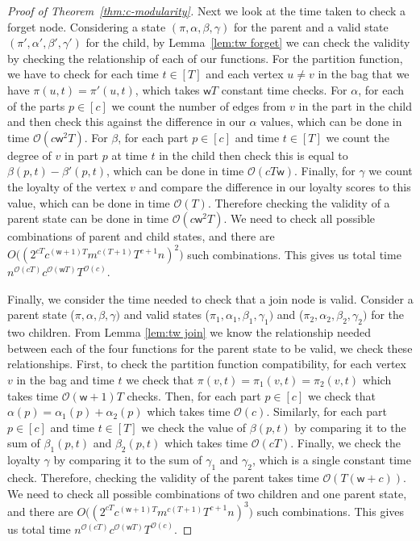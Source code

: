 \documentclass[runningheads]{llncs}
\newcommand{\w}{\mathsf{w}}
\begin{document}
\begin{proof}[Proof of Theorem~\ref{thm:c-modularity}]
    Next we look at the time taken to check a forget node. Considering a state $(\pi,\alpha,\beta,\gamma)$ for the parent and a valid state $(\pi',\alpha',\beta',\gamma')$ for the child, by  Lemma~\ref{lem:tw forget} we can check the validity by checking the relationship of each of our functions.
    For the partition function, we have to check for each time $t\in [T]$ and each vertex $u \neq v$ in the bag that we have $\pi(u,t)=\pi'(u,t)$, which takes $\w T$ constant time checks. 
    For $\alpha$, for each of the parts $p\in[c]$ we count the number of edges from $v$ in the part in the child and then check this against the difference in our $\alpha$ values, which can be done in time $\mathcal{O}(c\w ^2T)$.
    For $\beta$, for each part $p\in[c]$ and time $t\in[T]$ we count the degree of $v$ in part $p$ at time $t$ in the child then check this is equal to $\beta(p,t)-\beta'(p,t)$, which can be done in time $\mathcal{O}(cT\w )$.
    Finally, for $\gamma$ we count the loyalty of the vertex $v$ and compare the difference in our loyalty scores to this value, which can be done in time $\mathcal{O}(T)$.
    Therefore checking the validity of a parent state can be done in time $\mathcal{O}(c\w ^2T)$. 
    We need to check all possible combinations of parent and child states, and there are $O\big((2^{cT}c^{(\w +1)T}m^{c(T+1)}T^{c+1}n)^2\big)$
     such combinations. This gives us total time $n^{\mathcal{O}(cT)}c^{\mathcal{O}(\w T)}T^{\mathcal{O}(c)}$.

    Finally, we consider the time needed to check that a join node is valid. Consider a parent state ($\pi,\alpha,\beta,\gamma)$ and valid states ($\pi_1,\alpha_1,\beta_1,\gamma_1)$ and ($\pi_2,\alpha_2,\beta_2,\gamma_2)$ for the two children. From Lemma \ref{lem:tw join} we know the relationship needed between each of the four functions for the parent state to be valid, we check these relationships.
    First, to check the partition function compatibility, for each vertex $v$ in the bag and time $t$ we check that $\pi(v,t)=\pi_1(v,t)=\pi_2(v,t)$ which takes time $\mathcal{O}(\w+1)T$ checks.
    Then, for each part $p \in [c]$ we check that $\alpha(p)=\alpha_1(p)+\alpha_2(p)$ which takes time $\mathcal{O}(c)$.
    Similarly, for each part $p\in[c]$ and time $t\in[T]$ we check the value of $\beta(p,t)$ by comparing it to the sum of $\beta_1(p,t)$ and $\beta_2(p,t)$ which takes time $\mathcal{O}(cT)$.
    Finally, we check the loyalty $\gamma$ by comparing it to the sum of $\gamma_1$ and $\gamma_2$, which is a single constant time check.
    Therefore, checking the validity of the parent takes time $\mathcal{O}(T(\w+c))$.
    We need to check all possible combinations of two children and one parent state, and there are $O\big((2^{cT}c^{(\w+1)T}m^{c(T+1)}T^{c+1}n)^3\big)$ such combinations. This gives us total time $n^{\mathcal{O}(cT)}c^{\mathcal{O}(\w T)}T^{\mathcal{O}(c)}$.


\end{proof}
\end{document}
